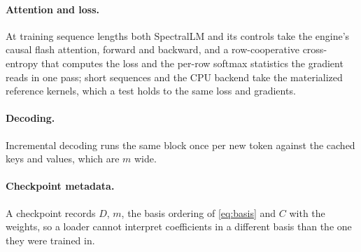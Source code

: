 \paragraph{Attention and loss.} At training sequence lengths both SpectralLM
and its controls take the engine's causal flash attention, forward and
backward, and a row-cooperative cross-entropy that computes the loss and the
per-row softmax statistics the gradient reads in one pass; short sequences and
the CPU backend take the materialized reference kernels, which a test holds
to the same loss and gradients.

\paragraph{Decoding.} Incremental decoding runs the same block once per new
token against the cached keys and values, which are $m$ wide.

\paragraph{Checkpoint metadata.} A checkpoint records $D$, $m$, the basis
ordering of \cref{eq:basis} and $C$ with the weights, so a loader cannot
interpret coefficients in a different basis than the one they were trained in.
